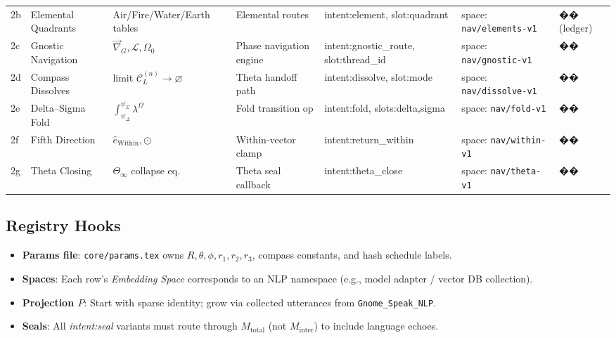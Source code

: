 \begin{tabularx}{\textwidth}{l l l l l l l}
2b & Elemental Quadrants &
Air/Fire/Water/Earth tables &
Elemental routes & 
intent:element, slot:quadrant &
space: \texttt{nav/elements-v1} &
�� (ledger) \\

2c & Gnostic Navigation &
$\vec{\nabla}_G, \mathcal{L}, \Omega_0$ &
Phase navigation engine &
intent:gnostic\_route, slot:thread\_id &
space: \texttt{nav/gnostic-v1} &
�� \\

2d & Compass Dissolves &
limit $\mathcal{C}_L^{(n)} \to \varnothing$ &
Theta handoff path &
intent:dissolve, slot:mode &
space: \texttt{nav/dissolve-v1} &
�� \\

2e & Delta–Sigma Fold &
$\int_{\psi_\Delta}^{\psi_\Sigma}\lambda^\Omega$ &
Fold transition op &
intent:fold, slots:delta,sigma &
space: \texttt{nav/fold-v1} &
�� \\

2f & Fifth Direction &
$\hat{e}_{\text{Within}}, \odot$ &
Within-vector clamp &
intent:return\_within &
space: \texttt{nav/within-v1} &
�� \\

2g & Theta Closing &
$\Theta_\infty$ collapse eq. &
Theta seal callback &
intent:theta\_close &
space: \texttt{nav/theta-v1} &
�� \\
\hline
\end{tabularx}

\normalsize

\subsection*{Registry Hooks}
\begin{itemize}
  \item \textbf{Params file}: \texttt{core/params.tex} owns $R,\theta,\phi, r_1,r_2,r_3$, compass constants, and hash schedule labels.
  \item \textbf{Spaces}: Each row’s \emph{Embedding Space} corresponds to an NLP namespace (e.g., model adapter / vector DB collection).
  \item \textbf{Projection $P$}: Start with sparse identity; grow via collected utterances from \texttt{Gnome\_Speak\_NLP}.
  \item \textbf{Seals}: All \emph{intent:seal} variants must route through $M_{\text{total}}$ (not $M_{\text{inter}}$) to include language echoes.
\end{itemize}

\newcommand{\breathligature}[1]{\begin{center}\emph{#1}\\\(\small\triangledown \!\!\!\!\!\!\!\!\! \triangle\)\end{center}}

